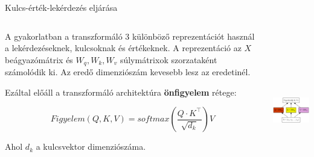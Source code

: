 \documentclass[english, aspectratio=169]{beamer}
\begin{document}
\begin{frame}{Kulcs-érték-lekérdezés eljárása}
\begin{columns}
\begin{column}{.6\textwidth}
A gyakorlatban a transzformáló 3 különböző reprezentációt használ a lekérdezéseknek, kulcsoknak és értékeknek. A reprezentáció az $X$ beágyazómátrix és $W_q, W_k, W_v$ súlymátrixok szorzataként számolódik ki. Az eredő dimenziószám kevesebb lesz az eredetinél.\par\smallskip
Ezáltal előáll a transzformáló architektúra \textbf{önfigyelem} rétege:
\begin{block}{}
\vspace{-0.4cm}
\[
Figyelem\left( Q,K,V \right) = softmax\left( \frac{Q \cdot K^\intercal}{\sqrt{d_k}}  \right)V
\]
\end{block} 
Ahol $d_k$ a kulcsvektor dimenziószáma.
\end{column}
\begin{column}{.4\textwidth}
\begin{center}
\includegraphics[width=6cm, height=7cm, keepaspectratio]{graphs/transformer_13.png}
\end{center}
\end{column}
\end{columns}
\end{frame}
\end{document}
